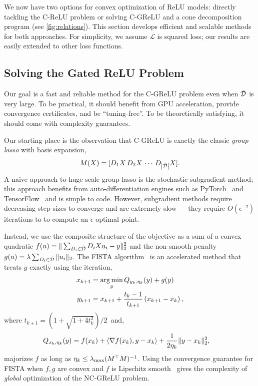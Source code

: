 
We now have two options for convex optimization of ReLU models: directly tackling the C-ReLU problem or solving C-GReLU and a cone decomposition program (see \cref{fig:relations}).
This section develops efficient and scalable methods for both approaches.
For simplicity, we assume \(\mathcal{L}\) is squared loss; our results are easily extended to other loss functions.

\subsection{Solving the Gated ReLU Problem}\label{sec:r-fista}

Our goal is a fast and reliable method for the C-GReLU problem even when \( \tilde {\mathcal{D}} \) is very large.
To be practical, it should benefit from GPU acceleration, provide convergence certificates, and be ``tuning-free''.
To be theoretically satisfying, it should come with complexity guarantees.

Our starting place is the observation that C-GReLU is exactly the classic \emph{group lasso} with basis expansion,
\[ M(X) = [D_1 X \, D_2 X \, \cdots \, D_{\left\vert \tilde {\mathcal{D}}\right\vert} X ]. \]
A naive approach to huge-scale group lasso is the stochastic subgradient method;
this approach benefits from auto-differentiation engines such as PyTorch~\citep{paszke2019pytorch} and TensorFlow~\citep{abadi2016tensorflow} and is simple to code.
However, subgradient methods require decreasing step-sizes to converge and are extremely slow --- they require \( O(\epsilon^{-2}) \) iterations to to compute an \( \epsilon \)-optimal point.

Instead, we use the composite structure of the objective as a sum of a convex quadratic \( f(u) = \|\sum_{D_i \in \tilde {\mathcal{D}}} D_i X u_i - y\|_2^2 \) and the non-smooth penalty \( g(u) = \lambda \sum_{D_i \in \tilde {\mathcal{D}}} \|u_i\|_2 \).
The FISTA algorithm~\citep{beck2009fista} is an accelerated method that treats \( g \) exactly using the iteration,
\begin{align}
    x_{k+1}
     & = \mathop{\rm arg\,min}_{y} Q_{y_k, \eta_k}(y) + g(y)               \label{eq:prox-gradient-mm} \\
    y_{k+1}
     & = x_{k+1} + \frac{t_k - 1}{t_{k + 1}} \left(x_{k+1} - x_k\right) \nonumber,
\end{align}
where \( t_{k + 1} = (1 + \sqrt{1 + 4 t_k^2}) / 2 \, \) and,
\begin{equation*}
    \begin{aligned}
        Q_{x_k, \eta_k}(y) & = f(x_k)  +  \left\langle\nabla f(x_k), y  -  x_k\right\rangle
        +  \frac{1}{2 \eta_k}\|y  -  x_k\|_2^2,
    \end{aligned}
\end{equation*}
majorizes \( f \) as long as \( \eta_k \leq \lambda_{\text{max}}(M^\top M)^{-1} \).
Using the convergence guarantee for FISTA when \( f, g \) are convex and $f$ is Lipschitz smooth~\citep{duchi2009forwardbackwardsplitting, beck2009fista, nesterov2007proximalgradient} gives the complexity of \emph{global} optimization of the NC-GReLU problem.


